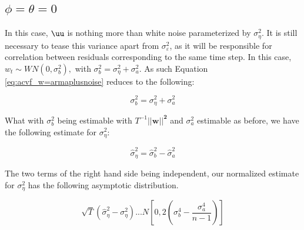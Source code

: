 \subsection{$\phi = \theta = 0$}

In this case, $\uu$ is nothing more than white noise parameterized by $\sigma_\eta^2$. It is still necessary to tease this variance apart from $\sigma_\varepsilon^2$, as it will be responsible for correlation between residuals corresponding to the same time step. In this case, $w_t \sim WN(0,\sigma_b^2),$ with $\sigma_b^2 = \sigma_\eta^2 + \sigma_a^2$. As such Equation \ref{eq:acvf_w=armaplusnoise} reduces to the following:

$$ \sigma_b^2 = \sigma_\eta^2 + \sigma_a^2 $$

What with $\sigma_b^2$ being estimable with $T^{-1}||\mathbf{w||^2}$ and $\sigma_a^2$ estimable as before, we have the following estimate for $\sigma_\eta^2$:

$$ \hat{\sigma}_\eta^2 = \hat{\sigma}_b^2 - \hat{\sigma}_a^2 $$

The two terms of the right hand side being independent, our normalized estimate for $\sigma_\eta^2$ has the following asymptotic distribution.

$$ \sqrt{T}(\hat{\sigma}_\eta^2 - \sigma_\eta^2) ... N\left[0,2\left(\sigma_b^4 - \frac{\sigma_a^4}{n-1}\right)\right] $$